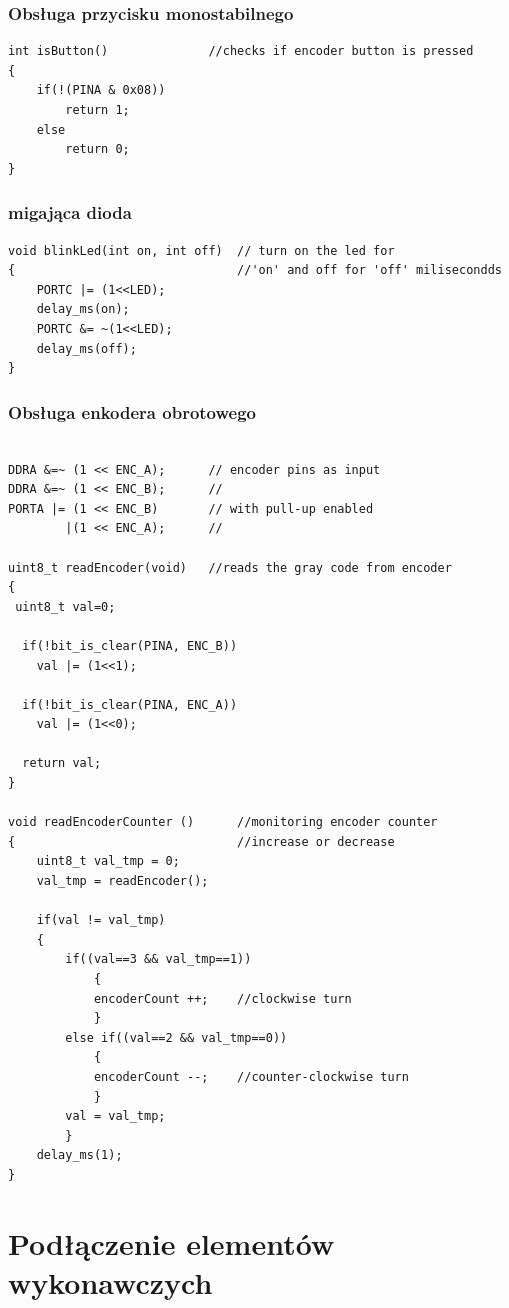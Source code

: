 \documentclass{article}
\begin{document}
\subsubsection{Obsługa przycisku monostabilnego}

\begin{verbatim}
int isButton()				//checks if encoder button is pressed
{
	if(!(PINA & 0x08))
		return 1;
	else
		return 0;
}
\end{verbatim}

\subsubsection{migająca dioda}

\begin{verbatim}
void blinkLed(int on, int off)	// turn on the led for 
{								//'on' and off for 'off' milisecondds
	PORTC |= (1<<LED);
	delay_ms(on);
	PORTC &= ~(1<<LED);
	delay_ms(off);
}
\end{verbatim}

\subsubsection{Obsługa enkodera obrotowego}

\begin{verbatim}

DDRA &=~ (1 << ENC_A);		// encoder pins as input
DDRA &=~ (1 << ENC_B);		//
PORTA |= (1 << ENC_B)		// with pull-up enabled
		|(1 << ENC_A);		//

uint8_t readEncoder(void)	//reads the gray code from encoder
{
 uint8_t val=0;

  if(!bit_is_clear(PINA, ENC_B))
	val |= (1<<1);

  if(!bit_is_clear(PINA, ENC_A))
	val |= (1<<0);

  return val;
}

void readEncoderCounter ()		//monitoring encoder counter 
{								//increase or decrease 
	uint8_t val_tmp = 0;						
	val_tmp = readEncoder();			

	if(val != val_tmp)
	{
		if((val==3 && val_tmp==1))
			{
			encoderCount ++;	//clockwise turn
			}
		else if((val==2 && val_tmp==0))
			{
			encoderCount --;	//counter-clockwise turn
			}
		val = val_tmp;
		}
	delay_ms(1);
}

\end{verbatim}

\section{Podłączenie elementów wykonawczych}
\end{document}

